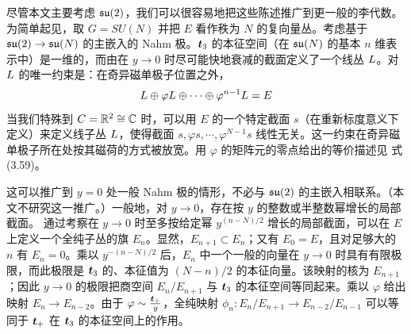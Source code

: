 尽管本文主要考虑 $\frak{su}(2)$，我们可以很容易地把这些陈述推广到更一般的李代数。为简单起见，取 $G=SU(N)$ 并把 $E$ 看作秩为 $N$ 的复向量丛。考虑基于 $\frak{su}(2) \to \frak{su}(N)$ 的主嵌入的 Nahm 极。$\ct_3$ 的本征空间（在 $\frak{su}(N)$ 的基本 $n$ 维表示中）是一维的，而由在 $y \to 0$ 时尽可能快地衰减的截面定义了一个线丛 $\L$。对 $\L$ 的唯一约束是：在奇异磁单极子位置之外，
\begin{equation}
 \L \oplus \varphi \L \oplus  \cdots \oplus \varphi^{n -1} \L = E
\end{equation}
当我们特殊到 $C=\R^2\cong \C$ 时，可以用 $E$ 的一个特定截面 $s$（在重新标度意义下定义）来定义线子丛 $\L$，使得截面 $s, \varphi s, \cdots,\varphi^{N-1}s$ 线性无关。这一约束在奇异磁单极子所在处按其磁荷的方式被放宽。用 $\varphi$ 的矩阵元的零点给出的等价描述见 \cite{fiveknots} 式 (3.59)。

这可以推广到 $y=0$ 处一般 Nahm 极的情形，不必与 $\frak{su}(2)$ 的主嵌入相联系。（本文不研究这一推广。）一般地，对 $y\to 0$，存在按 $y$ 的整数或半整数幂增长的局部截面。
通过考察在 $y \to 0$ 时至多按给定幂 $y^{(n-N)/2}$ 增长的局部截面，可以在 $E$ 上定义一个全纯子丛的旗 $E_n$。显然，$E_{n+1} \subset E_n$；又有  $E_0=E$，且对足够大的 $n$ 有 $E_n=0$。乘以 $y^{-(n-N)/2}$ 后，$E_n$ 中一个一般的向量在 $y \to 0$ 时具有有限极限，而此极限是 $\ct_3$ 的、本征值为 $(N-n)/2$ 的本征向量。该映射的核为 $E_{n+1}$；因此 $y \to 0$ 的极限把商空间 $E_n/E_{n+1}$ 与 $\ct_3$ 的本征空间等同起来。乘以 $\varphi$ 给出映射 $E_n \to E_{n-2}$。由于 $\varphi \sim \frac{\ct_+}{y}$，全纯映射 $\phi_n : E_n/E_{n+1} \to E_{n-2}/E_{n-1}$ 可以等同于 $\ct_+$ 在 $\ct_3$ 的本征空间上的作用。
